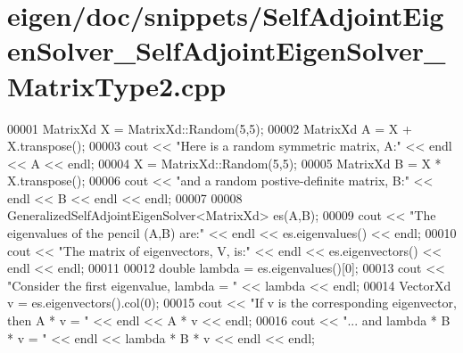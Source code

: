 \hypertarget{eigen_2doc_2snippets_2_self_adjoint_eigen_solver___self_adjoint_eigen_solver___matrix_type2_8cpp_source}{}\section{eigen/doc/snippets/\+Self\+Adjoint\+Eigen\+Solver\+\_\+\+Self\+Adjoint\+Eigen\+Solver\+\_\+\+Matrix\+Type2.cpp}
\label{eigen_2doc_2snippets_2_self_adjoint_eigen_solver___self_adjoint_eigen_solver___matrix_type2_8cpp_source}

\begin{DoxyCode}
00001 MatrixXd X = MatrixXd::Random(5,5);
00002 MatrixXd A = X + X.transpose();
00003 cout << \textcolor{stringliteral}{"Here is a random symmetric matrix, A:"} << endl << A << endl;
00004 X = MatrixXd::Random(5,5);
00005 MatrixXd B = X * X.transpose();
00006 cout << \textcolor{stringliteral}{"and a random postive-definite matrix, B:"} << endl << B << endl << endl;
00007 
00008 GeneralizedSelfAdjointEigenSolver<MatrixXd> es(A,B);
00009 cout << \textcolor{stringliteral}{"The eigenvalues of the pencil (A,B) are:"} << endl << es.eigenvalues() << endl;
00010 cout << \textcolor{stringliteral}{"The matrix of eigenvectors, V, is:"} << endl << es.eigenvectors() << endl << endl;
00011 
00012 \textcolor{keywordtype}{double} lambda = es.eigenvalues()[0];
00013 cout << \textcolor{stringliteral}{"Consider the first eigenvalue, lambda = "} << lambda << endl;
00014 VectorXd v = es.eigenvectors().col(0);
00015 cout << \textcolor{stringliteral}{"If v is the corresponding eigenvector, then A * v = "} << endl << A * v << endl;
00016 cout << \textcolor{stringliteral}{"... and lambda * B * v = "} << endl << lambda * B * v << endl << endl;
\end{DoxyCode}
